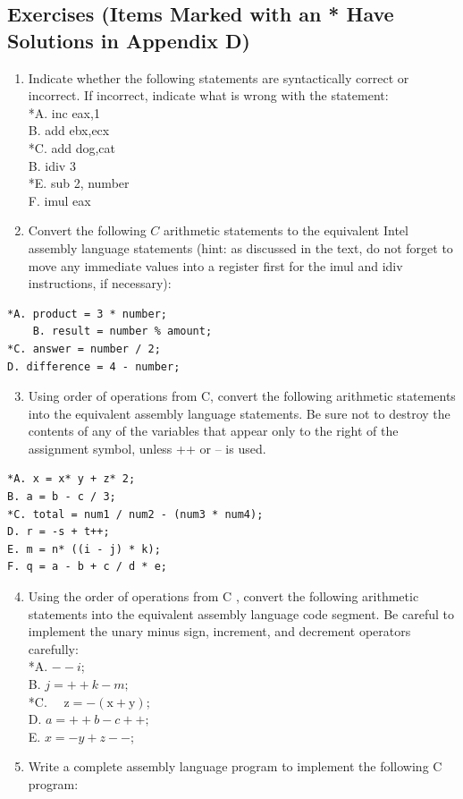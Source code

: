 \documentclass[10pt]{book}
\begin{document}
\subsection{Exercises (Items Marked with an * Have Solutions in Appendix D)}
\begin{enumerate}
  \item Indicate whether the following statements are syntactically correct or incorrect. If incorrect, indicate what is wrong with the statement:\\
*A. inc eax,1\\
B. add ebx,ecx\\
*C. add dog,cat\\
B. idiv 3\\
*E. sub 2, number\\
F. imul eax
  \item Convert the following $C$ arithmetic statements to the equivalent Intel assembly language statements (hint: as discussed in the text, do not forget to move any immediate values into a register first for the imul and idiv instructions, if necessary):
\end{enumerate}

\begin{verbatim}
*A. product = 3 * number;
    B. result = number % amount;
*C. answer = number / 2;
D. difference = 4 - number;
\end{verbatim}

\begin{enumerate}
  \setcounter{enumi}{2}
  \item Using order of operations from C, convert the following arithmetic statements into the equivalent assembly language statements. Be sure not to destroy the contents of any of the variables that appear only to the right of the assignment symbol, unless ++ or -- is used.
\end{enumerate}

\begin{verbatim}
*A. x = x* y + z* 2;
B. a = b - c / 3;
*C. total = num1 / num2 - (num3 * num4);
D. r = -s + t++;
E. m = n* ((i - j) * k);
F. q = a - b + c / d * e;
\end{verbatim}

\begin{enumerate}
  \setcounter{enumi}{3}
  \item Using the order of operations from C , convert the following arithmetic statements into the equivalent assembly language code segment. Be careful to implement the unary minus sign, increment, and decrement operators carefully:\\

*A. $--i$;\\
B. $j=++k-m ;$\\
*C. $\quad \mathrm{z}=-(\mathrm{x}+\mathrm{y})$;\\
D. $a=++b-c++;$\\
E. $x=-y+z--$;
  \item Write a complete assembly language program to implement the following C program:
\end{enumerate}
\end{document}
